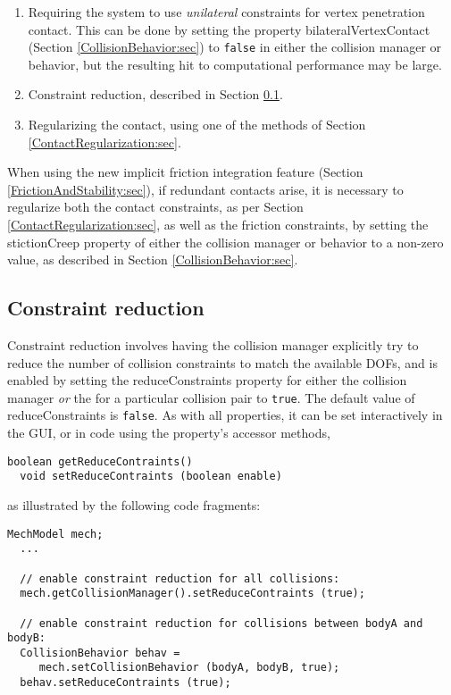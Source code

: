 \begin{enumerate}

\item Requiring the system to use {\it unilateral} constraints for
vertex penetration contact. This can be done by setting the
property {\sf bilateralVertexContact} (Section
\ref{CollisionBehavior:sec}) to {\tt false} in either the collision
manager or behavior, but the resulting hit to computational
performance may be large.

\item Constraint reduction, described in Section
\ref{ConstraintReduction:sec}.

\item Regularizing the contact, using one of the methods
of Section \ref{ContactRegularization:sec}.

\end{enumerate}

\begin{sideblock}
When using the new implicit friction integration feature (Section
\ref{FrictionAndStability:sec}), if redundant contacts arise, it is
necessary to regularize both the contact constraints, as per Section
\ref{ContactRegularization:sec}, as well as the friction constraints,
by setting the {\sf stictionCreep} property of either the collision
manager or behavior to a non-zero value, as described in Section
\ref{CollisionBehavior:sec}.
\end{sideblock}

\subsection{Constraint reduction}
\label{ConstraintReduction:sec}

Constraint reduction involves having the collision manager explicitly
try to reduce the number of collision constraints to match the
available DOFs, and is enabled by setting the {\sf reduceConstraints}
property for either the collision manager
{\it or} the 
for a particular collision pair to {\tt true}. The default value of
{\sf reduceConstraints} is {\tt false}. As with all properties, it can
be set interactively in the GUI, or in code using the property's
accessor methods,
%
\begin{lstlisting}[]
  boolean getReduceContraints()
  void setReduceContraints (boolean enable)
\end{lstlisting}
%
as illustrated by the following code fragments:
%
\begin{lstlisting}[]
  MechModel mech;
  ...

  // enable constraint reduction for all collisions:
  mech.getCollisionManager().setReduceContraints (true);

  // enable constraint reduction for collisions between bodyA and bodyB:
  CollisionBehavior behav = 
     mech.setCollisionBehavior (bodyA, bodyB, true);
  behav.setReduceContraints (true);
\end{lstlisting}
%

